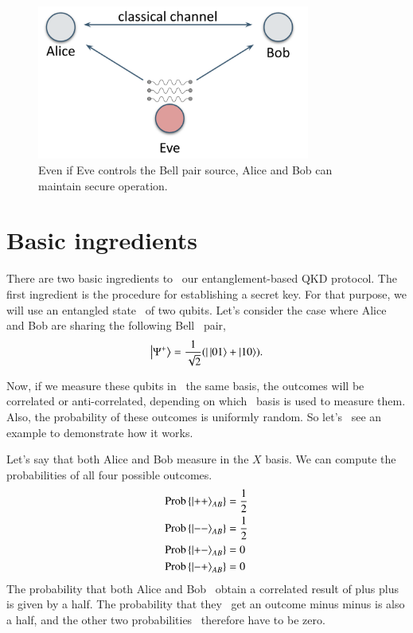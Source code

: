 \begin{figure}[H]
    \centering
    \includegraphics[width=0.8\textwidth]{lesson10/e91-eve-as-source.png}
        \caption[E91 with Eve as Bell pair source]{Even if Eve controls the Bell pair source, Alice and Bob can maintain secure operation.}
    \label{fig:eve-e91}
\end{figure}

\section{Basic ingredients}

There are two basic ingredients to 
our entanglement-based QKD protocol.
The first ingredient is the procedure for
establishing a secret key.
For that purpose, we will use an entangled state 
of two qubits.
Let's consider the case where Alice and Bob are sharing the following Bell 
pair,
\begin{align}
\left| \Psi^{+} \right\rangle=\frac{1}{\sqrt{2}}(|\left| 01 \right\rangle+\left| 10 \right\rangle).
\end{align}

Now, if we measure these qubits in 
the same basis, the outcomes will be
correlated or anti-correlated, depending on which 
basis is used to measure them. Also, the probability
of these outcomes is uniformly random. So let's 
see an example to demonstrate how it works.

Let's say that both Alice and Bob
measure in the $X$ basis. We can compute the 
probabilities of all four possible outcomes.
\begin{align}
\begin{aligned}
\operatorname{Prob}\left\{\left| ++ \right\rangle_{A B}\right\} &= \frac{1}{2} \\ 
\operatorname{Prob}\left\{\left| -- \right\rangle_{A B}\right\} &= \frac{1}{2} \\
\operatorname{Prob}\left\{\left| +- \right\rangle_{A B}\right\} &= 0 \\ 
\operatorname{Prob}\left\{\left| -+ \right\rangle_{A B}\right\} &= 0
\end{aligned}
\end{align}
The probability that both Alice and Bob 
obtain a correlated result of plus plus
is given by a half. The probability that they 
get an outcome minus minus is also a half,
and the other two probabilities 
therefore have to be zero.

